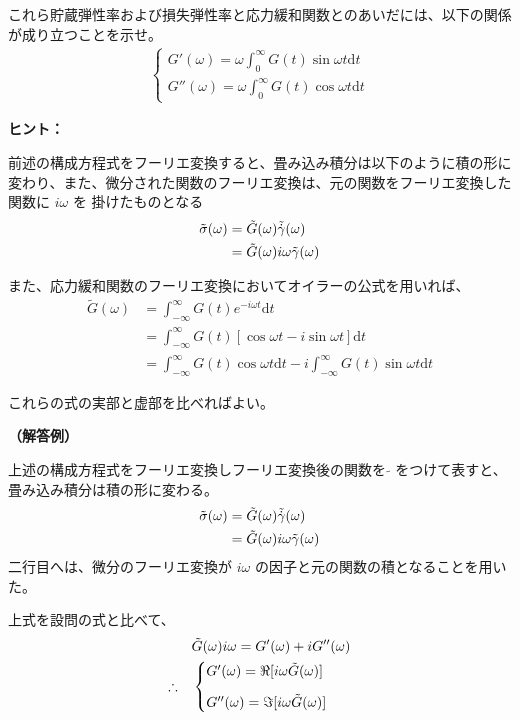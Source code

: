 \documentclass[uplatex,dvipdfmx,a4paper,11pt]{jsarticle}
\newcommand{\diff}{\mathrm d}
\begin{document}
\begin{enumerate}
これら貯蔵弾性率および損失弾性率と応力緩和関数とのあいだには、以下の関係が成り立つことを示せ。
\begin{align*}
\begin{cases}
\displaystyle G' (\omega) = \omega \int_0^{\infty} G(t) \sin \omega t \diff t \\[8pt]
\displaystyle G'' (\omega) = \omega \int_0^{\infty} G(t) \cos \omega t \diff t
\end{cases}
\end{align*}

\begin{itembox}[l]{{\bf ヒント：}}

前述の構成方程式をフーリエ変換すると、畳み込み積分は以下のように積の形に変わり、また、微分された関数のフーリエ変換は、元の関数をフーリエ変換した関数に $i\omega$ を 掛けたものとなる
\begin{align*}
\tilde{\sigma}(\omega) 
	&= \tilde{G} (\omega) \tilde{\dot{\gamma}}(\omega) \notag \\
	&= \tilde{G} (\omega) i\omega \tilde{\gamma}(\omega)
\end{align*}

また、応力緩和関数のフーリエ変換においてオイラーの公式を用いれば、
\begin{align*}
\tilde{G} (\omega) 
	&= \int_{-\infty}^{\infty} G(t) e^{-i\omega t} \diff t \\
	&= \int_{-\infty}^{\infty} G(t) [\cos \omega t - i \sin \omega t ] \diff t \\
	&= \int_{-\infty}^{\infty} G(t) \cos \omega t \diff t -i \int_{-\infty}^{\infty} G(t) \sin \omega t \diff t
\end{align*}

これらの式の実部と虚部を比べればよい。

\end{itembox}

{\bf （解答例）}

上述の構成方程式をフーリエ変換しフーリエ変換後の関数を $\tilde{}$ をつけて表すと、畳み込み積分は積の形に変わる。
\begin{align*}
\tilde{\sigma}(\omega) 
	&= \tilde{G} (\omega) \tilde{\dot{\gamma}}(\omega) \notag \\
	&= \tilde{G} (\omega) i\omega \tilde{\gamma}(\omega)
\end{align*}
二行目へは、微分のフーリエ変換が $i\omega$ の因子と元の関数の積となることを用いた。

上式を設問の式と比べて、
\begin{align*}
&\tilde{G} (\omega) i\omega = G'(\omega) + i G''(\omega) \notag \\
\therefore \quad &
\begin{cases}
G'(\omega) = \Re [i\omega \tilde{G} (\omega)] \\[8pt]
G''(\omega) = \Im [i\omega \tilde{G} (\omega)] 
\end{cases}
\end{align*}


\end{enumerate}
\end{document}
